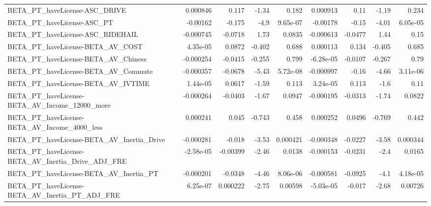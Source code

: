 \begin{tabular}{lrrrrrrrr}
BETA\_PT\_haveLicense-ASC\_DRIVE                      &    0.000846 &        0.117 &    -1.34 &    0.182 &   0.000913 &        0.11 &        -1.19 &         0.234 \\
BETA\_PT\_haveLicense-ASC\_PT                         &    -0.00162 &       -0.175 &     -4.9 & 9.65e-07 &   -0.00178 &       -0.15 &        -4.01 &      6.05e-05 \\
BETA\_PT\_haveLicense-ASC\_RIDEHAIL                   &   -0.000745 &      -0.0718 &     1.73 &   0.0835 &  -0.000613 &     -0.0477 &         1.44 &          0.15 \\
BETA\_PT\_haveLicense-BETA\_AV\_COST                   &    4.35e-05 &       0.0872 &   -0.402 &    0.688 &   0.000113 &       0.134 &       -0.405 &         0.685 \\
BETA\_PT\_haveLicense-BETA\_AV\_Chinese                &   -0.000254 &      -0.0415 &   -0.255 &    0.799 &  -6.28e-05 &     -0.0107 &       -0.267 &          0.79 \\
BETA\_PT\_haveLicense-BETA\_AV\_Commute                &   -0.000357 &      -0.0678 &    -5.43 & 5.72e-08 &  -0.000997 &       -0.16 &        -4.66 &      3.11e-06 \\
BETA\_PT\_haveLicense-BETA\_AV\_IVTIME                 &    1.44e-05 &       0.0617 &    -1.59 &    0.113 &   3.24e-05 &       0.113 &         -1.6 &          0.11 \\
BETA\_PT\_haveLicense-BETA\_AV\_Income\_12000\_more      &   -0.000264 &      -0.0403 &    -1.67 &   0.0947 &  -0.000195 &     -0.0313 &        -1.74 &        0.0822 \\
BETA\_PT\_haveLicense-BETA\_AV\_Income\_4000\_less       &    0.000241 &        0.045 &   -0.743 &    0.458 &   0.000252 &      0.0496 &       -0.769 &         0.442 \\
BETA\_PT\_haveLicense-BETA\_AV\_Inertia\_Drive          &   -0.000281 &       -0.018 &    -3.53 & 0.000421 &  -0.000348 &     -0.0227 &        -3.58 &      0.000344 \\
BETA\_PT\_haveLicense-BETA\_AV\_Inertia\_Drive\_ADJ\_FRE  &   -2.58e-05 &     -0.00399 &    -2.46 &   0.0138 &  -0.000153 &     -0.0231 &         -2.4 &        0.0165 \\
BETA\_PT\_haveLicense-BETA\_AV\_Inertia\_PT             &   -0.000201 &      -0.0348 &    -4.46 & 8.06e-06 &  -0.000581 &     -0.0925 &         -4.1 &      4.18e-05 \\
BETA\_PT\_haveLicense-BETA\_AV\_Inertia\_PT\_ADJ\_FRE     &    6.25e-07 &     0.000222 &    -2.75 &  0.00598 &  -5.03e-05 &      -0.017 &        -2.68 &       0.00726 \\

\end{tabular}
